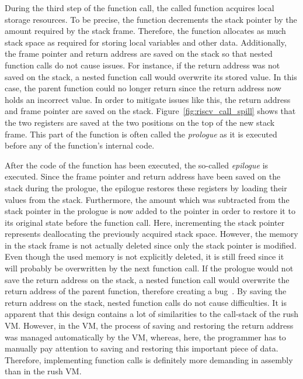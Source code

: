During the third step of the function call, the called function acquires local storage resources.
To be precise, the function decrements the stack pointer by the amount required by the stack frame.
Therefore, the function allocates as much stack space as required for storing local variables and other data.
Additionally, the frame pointer and return address are saved on the stack so that nested function calls do not cause issues.
For instance, if the return address was not saved on the stack, a nested function call would overwrite its stored value.
In this case, the parent function could no longer return since the return address now holds an incorrect value.
In order to mitigate issues like this, the return address and frame pointer are saved on the stack.
Figure~\ref{fig:riscv_call_spill} shows that the two registers are saved at the two positions on the top of the new stack frame.
This part of the function is often called the \emph{prologue} as it is executed before any of the function's internal code.

After the code of the function has been executed, the so-called \emph{epilogue} is executed.
Since the frame pointer and return address have been saved on the stack during the prologue,
the epilogue restores these registers by loading their values from the stack.
Furthermore, the amount which was subtracted from the stack pointer in the prologue is now added to the pointer in order to restore it to its original state before the function call.
Here, incrementing the stack pointer represents deallocating the previously acquired stack space.
However, the memory in the stack frame is not actually deleted since only the stack pointer is modified.
Even though the used memory is not explicitly deleted, it is still freed since it will probably be overwritten by the next function call.
If the prologue would not save the return address on the stack, a nested function call would overwrite the return address of the parent function, therefore creating a bug~\cite[p.~33]{Patterson2017}.
By saving the return address on the stack, nested function calls do not cause difficulties.
It is apparent that this design contains a lot of similarities to the call-stack of the rush VM\@.
However, in the VM, the process of saving and restoring the return address was managed automatically by the VM,
whereas, here, the programmer has to manually pay attention to saving and restoring this important piece of data.
Therefore, implementing function calls is definitely more demanding in \riscv{} assembly than in the rush VM\@.

